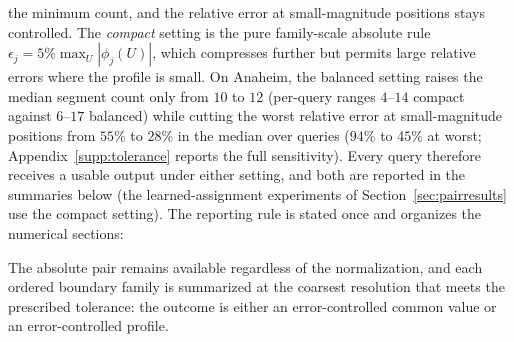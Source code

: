 \documentclass[a4paper,fleqn]{cas-sc}
\begin{document}
the minimum count, and the relative error at small-magnitude
positions stays controlled. The \emph{compact} setting is the pure
family-scale absolute rule $\epsilon_j=5\%\max_U|\phi_j(U)|$, which
compresses further but permits large relative errors where the profile
is small. On Anaheim, the balanced setting raises the median segment
count only from $10$ to $12$ (per-query ranges $4$--$14$ compact
against $6$--$17$ balanced) while cutting the worst relative error at
small-magnitude positions from $55\%$ to $28\%$ in the median over
queries ($94\%$ to $45\%$ at worst; Appendix~\ref{supp:tolerance}
reports the full sensitivity).
Every query therefore receives a usable output under either setting,
and both are reported in the summaries below (the learned-assignment
experiments of Section~\ref{sec:pairresults} use the compact setting).
The reporting rule is stated once and organizes the numerical sections:

\medskip
\noindent{}
\medskip

\noindent The absolute pair remains available regardless of the
normalization, and each ordered boundary family is summarized at the
coarsest resolution that meets the prescribed tolerance: the outcome is
either an error-controlled common value or an error-controlled
profile.


\end{document}
